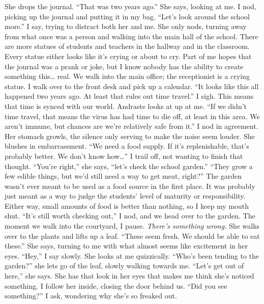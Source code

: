 \documentclass[a4paper, 12pt]{book}
\newcommand\tab[1][1cm]{\hspace*{#1}}
\begin{document}
\tab
She drops the journal. “That was two years ago.” She says, looking at me.
\newline
\tab
I nod, picking up the journal and putting it in my bag. “Let’s look around the school more.” I say, trying to distract both her and me. She only nods, turning away from what once was a person and walking into the main hall of the school. There are more statues of students and teachers in the hallway and in the classroom. Every statue either looks like it’s crying or about to cry. Part of me hopes that the journal was a prank or joke, but I know nobody has the ability to create something this… real. We walk into the main office; the receptionist is a crying statue. I walk over to the front desk and pick up a calendar. “It looks like this all happened two years ago. At least that rules out time travel.” I sigh. This means that time is synced with our world.
\newline
\tab
Andraste looks at up at me. “If we didn’t time travel, that means the virus has had time to die off, at least in this area. We aren’t immune, but chances are we’re relatively safe from it.” I nod in agreement. Her stomach growls, the silence only serving to make the noise seem louder. She blushes in embarrassment.
\newline
\tab
“We need a food supply. If it’s replenishable, that’s probably better. We don’t know how…” I trail off, not wanting to finish that thought.
\newline
\tab
“You’re right,” she says, “let’s check the school garden.”
\newline
\tab
“They grow a few edible things, but we’d still need a way to get meat, right?” The garden wasn’t ever meant to be used as a food source in the first place. It was probably just meant as a way to judge the students’ level of maturity or responsibility. Either way, small amounts of food is better than nothing, so I keep my mouth shut.
\newline
\tab
“It’s still worth checking out,” I nod, and we head over to the garden. The moment we walk into the courtyard, I pause. \textit{There’s something wrong.} She walks over to the plants and lifts up a leaf. “These seem fresh. We should be able to eat these.” She says, turning to me with what almost seems like excitement in her eyes.
\newline
\tab
“Hey,” I say slowly. She looks at me quizzically. “Who’s been tending to the garden?” she lets go of the leaf, slowly walking towards me. “Let’s get out of here,” she says. She has that look in her eyes that makes me think she’s noticed something. I follow her inside, closing the door behind us. “Did you see something?” I ask, wondering why she’s so freaked out.
\end{document}
